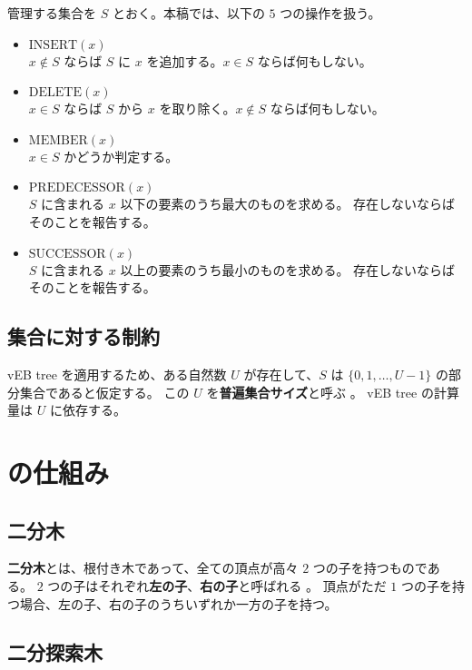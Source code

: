 \documentclass[dvipdfmx,a4j,10pt]{jarticle}
\begin{document}
管理する集合を $S$ とおく。本稿では、以下の $5$ つの操作を扱う。

\begin{itemize}
  \item $\mathrm{INSERT}(x)$ \mbox{}\\
    $x \notin S$ ならば $S$ に $x$ を追加する。$x \in S$ ならば何もしない。
  \item $\mathrm{DELETE}(x)$ \mbox{}\\
    $x \in S$ ならば $S$ から $x$ を取り除く。$x \notin S$ ならば何もしない。
  \item $\mathrm{MEMBER}(x)$ \mbox{}\\
    $x \in S$ かどうか判定する。
  \item $\mathrm{PREDECESSOR}(x)$ \mbox{}\\
    $S$ に含まれる $x$ 以下の要素のうち最大のものを求める。
    存在しないならばそのことを報告する。
  \item $\mathrm{SUCCESSOR}(x)$ \mbox{}\\
    $S$ に含まれる $x$ 以上の要素のうち最小のものを求める。
    存在しないならばそのことを報告する。
\end{itemize}

\subsection{集合に対する制約}

vEB tree を適用するため、ある自然数 $U$ が存在して、$S$ は $\{0, 1, \dots, U-1\}$ の部分集合であると仮定する。
この $U$ を\textbf{普遍集合サイズ}と呼ぶ \cite{AlgorithmIntroduction}。
vEB tree の計算量は $U$ に依存する。

\section{ の仕組み}

\subsection{二分木}

\textbf{二分木}とは、根付き木であって、全ての頂点が高々 $2$ つの子を持つものである。
$2$ つの子はそれぞれ\textbf{左の子}、\textbf{右の子}と呼ばれる \cite{Data}。
頂点がただ $1$ つの子を持つ場合、左の子、右の子のうちいずれか一方の子を持つ。

\subsection{二分探索木}
\end{document}

